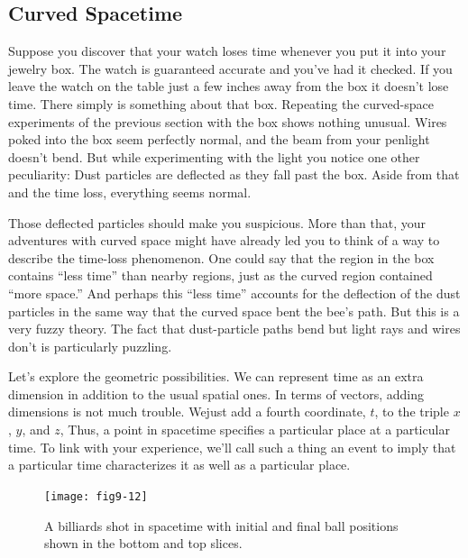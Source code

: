 \documentclass{book}
\begin{document}
\subsection{Curved Spacetime}

Suppose you discover that your watch loses time whenever you put it
into your jewelry box. The watch is guaranteed accurate and you've had
it checked. If you leave the watch on the table just a few inches away
from the box it doesn't lose time. There simply is something about that
box. Repeating the curved-space experiments of the previous section
with the box shows nothing unusual. Wires poked into the box seem
perfectly normal, and the beam from your penlight doesn't bend. But
while experimenting with the light you notice one other peculiarity: Dust
particles are deflected as they fall past the box. Aside from that and the
time loss, everything seems normal.

Those deflected particles should make you suspicious. More than that,
your adventures with curved space might have already led you to think
of a way to describe the time-loss phenomenon. One could say that the
region in the box contains ``less time'' than nearby regions, just as the
curved region contained ``more space.'' And perhaps this ``less time''
accounts for the deflection of the dust particles in the same way that
the curved space bent the bee's path. But this is a very fuzzy theory.
The fact that dust-particle paths bend but light rays and wires don't is
particularly puzzling.

Let's explore the geometric possibilities. We can represent time as an
extra dimension in addition to the usual spatial ones. In terms of vectors,
adding dimensions is not much trouble. Wejust add a fourth coordinate,
$t$, to the triple $x$, $y$, and $z$, Thus, a point in spacetime specifies a
particular place at a particular time. To link with your experience, we'll
call such a thing an event to imply that a particular time characterizes
it as well as a particular place.

\begin{figure}
\begin{center}
\texttt{[image: fig9-12]}
\caption{A billiards shot in spacetime with initial and final ball positions shown in the bottom and top slices.}
\end{center}
\end{figure}
\end{document}
